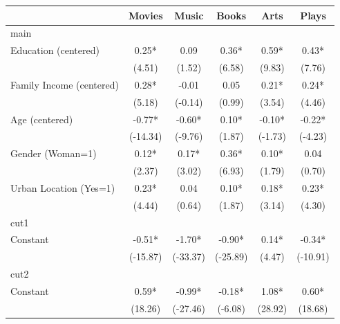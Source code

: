 {
\def\sym#1{\ifmmode^{#1}\else\(^{#1}\)\fi}
\begin{tabular*}{\hsize}{@{\hskip\tabcolsep\extracolsep\fill}l*{5}{c}}
\toprule
                    &\multicolumn{1}{c}{Movies}&\multicolumn{1}{c}{Music}&\multicolumn{1}{c}{Books}&\multicolumn{1}{c}{Arts}&\multicolumn{1}{c}{Plays}\\
\midrule
main                &             &             &             &             &             \\
Education (centered)&        0.25*&        0.09 &        0.36*&        0.59*&        0.43*\\
                    &      (4.51) &      (1.52) &      (6.58) &      (9.83) &      (7.76) \\
Family Income (centered)&        0.28*&       -0.01 &        0.05 &        0.21*&        0.24*\\
                    &      (5.18) &     (-0.14) &      (0.99) &      (3.54) &      (4.46) \\
Age (centered)      &       -0.77*&       -0.60*&        0.10*&       -0.10*&       -0.22*\\
                    &    (-14.34) &     (-9.76) &      (1.87) &     (-1.73) &     (-4.23) \\
Gender (Woman=1)    &        0.12*&        0.17*&        0.36*&        0.10*&        0.04 \\
                    &      (2.37) &      (3.02) &      (6.93) &      (1.79) &      (0.70) \\
Urban Location (Yes=1)&        0.23*&        0.04 &        0.10*&        0.18*&        0.23*\\
                    &      (4.44) &      (0.64) &      (1.87) &      (3.14) &      (4.30) \\
\midrule
cut1                &             &             &             &             &             \\
Constant            &       -0.51*&       -1.70*&       -0.90*&        0.14*&       -0.34*\\
                    &    (-15.87) &    (-33.37) &    (-25.89) &      (4.47) &    (-10.91) \\
\midrule
cut2                &             &             &             &             &             \\
Constant            &        0.59*&       -0.99*&       -0.18*&        1.08*&        0.60*\\
                    &     (18.26) &    (-27.46) &     (-6.08) &     (28.92) &     (18.68) \\

\end{tabular*}}
